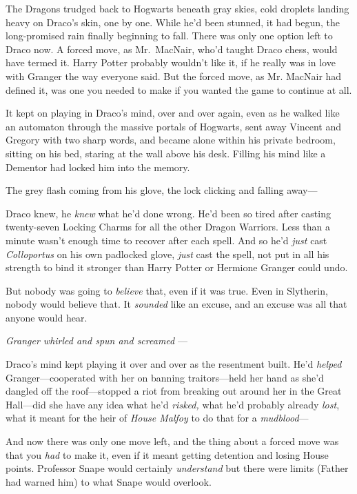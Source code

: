 The Dragons trudged back to Hogwarts beneath gray skies, cold
droplets landing heavy on Draco’s skin, one by one. While he’d been
stunned, it had begun, the long-promised rain finally beginning to
fall. There was only one option left to Draco now. A forced move,
as Mr.~MacNair, who’d taught Draco chess, would have termed it.
Harry Potter probably wouldn’t like it, if he really was in love
with Granger the way everyone said. But the forced move, as Mr.
MacNair had defined it, was one you needed to make if you wanted
the game to continue at all.

It kept on playing in Draco’s mind, over and over again, even as
he walked like an automaton through the massive portals of
Hogwarts, sent away Vincent and Gregory with two sharp words, and
became alone within his private bedroom, sitting on his bed,
staring at the wall above his desk. Filling his mind like a
Dementor had locked him into the memory.

The grey flash coming from his glove, the lock clicking and
falling away—

Draco knew, he \emph{knew} what he’d done wrong. He’d been so
tired after casting twenty-seven Locking Charms for all the other
Dragon Warriors. Less than a minute wasn’t enough time to recover
after each spell. And so he’d \emph{just} cast \emph{Colloportus}
on his own padlocked glove, \emph{just} cast the spell, not put in
all his strength to bind it stronger than Harry Potter or Hermione
Granger could undo.

But nobody was going to \emph{believe} that, even if it was
true. Even in Slytherin, nobody would believe that. It
\emph{sounded} like an excuse, and an excuse was all that anyone
would hear.

\emph{Granger whirled and spun and screamed }—

Draco’s mind kept playing it over and over as the resentment
built. He’d \emph{helped} Granger—cooperated with her on banning
traitors—held her hand as she’d dangled off the roof—stopped a
riot from breaking out around her in the Great Hall—did she have
any idea what he’d \emph{risked,} what he’d probably already
\emph{lost}, what it meant for the heir of \emph{House Malfoy} to
do that for a \emph{mudblood}—

And now there was only one move left, and the thing about a
forced move was that you \emph{had} to make it, even if it meant
getting detention and losing House points. Professor Snape would
certainly \emph{understand} but there were limits (Father had
warned him) to what Snape would overlook.

